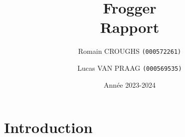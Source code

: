\documentclass[french]{report}
\title{Frogger \\ Rapport}
\date{Année 2023-2024}
\author{Romain CROUGHS \texttt{(000572261)} \and Lucas VAN PRAAG \texttt{(000569535)}}
\begin{document}
\maketitle

\chapter{Introduction}
\end{document}
